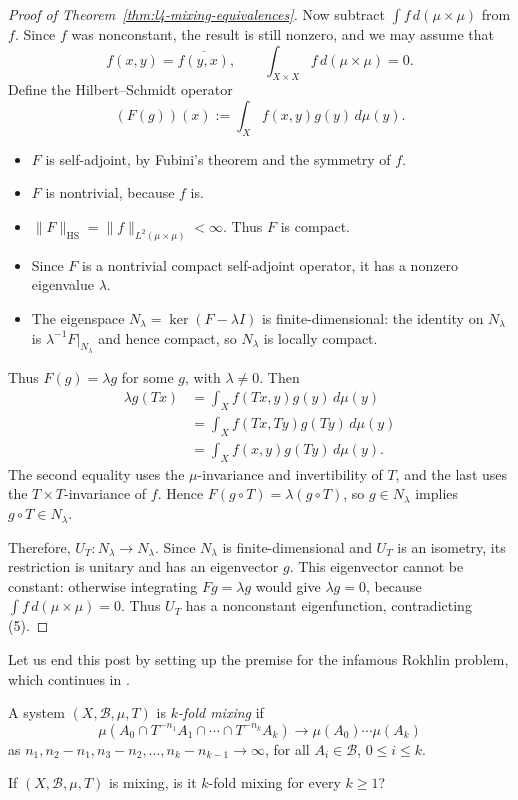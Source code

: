 \documentclass[11pt,a4paper]{article}
\begin{document}
\begin{proof}[Proof of Theorem~\ref{thm:l4-mixing-equivalences}]
Now subtract $\int f\,d(\mu\times\mu)$ from $f$. Since $f$ was nonconstant,
the result is still nonzero, and we may assume that
\[
 f(x,y)=\overline{f(y,x)},\qquad \int_{X\times X}f\,d(\mu\times\mu)=0.
\]
Define the Hilbert--Schmidt operator
\[
 (F(g))(x):=\int_Xf(x,y)g(y)\,d\mu(y).
\]
\begin{itemize}
 \item $F$ is self-adjoint, by Fubini's theorem and the symmetry of $f$.
 \item $F$ is nontrivial, because $f$ is.
 \item $\|F\|_{\mathrm{HS}}=\|f\|_{L^2(\mu\times\mu)}<\infty$. Thus $F$ is
 compact.
 \item Since $F$ is a nontrivial compact self-adjoint operator, it has a
 nonzero eigenvalue $\lambda$.
 \item The eigenspace $N_\lambda=\ker(F-\lambda I)$ is finite-dimensional:
 the identity on $N_\lambda$ is $\lambda^{-1}F|_{N_\lambda}$ and hence
 compact, so $N_\lambda$ is locally compact.
\end{itemize}
Thus $F(g)=\lambda g$ for some $g$, with $\lambda\ne0$. Then
\[
 \begin{aligned}
 \lambda g(Tx)
 &=\int_X f(Tx,y)g(y)\,d\mu(y)\\
 &=\int_X f(Tx,Ty)g(Ty)\,d\mu(y)\\
 &=\int_X f(x,y)g(Ty)\,d\mu(y).
 \end{aligned}
\]
The second equality uses the $\mu$-invariance and invertibility of $T$, and
the last uses the $T\times T$-invariance of $f$. Hence
$F(g\circ T)=\lambda(g\circ T)$, so $g\in N_\lambda$ implies
$g\circ T\in N_\lambda$.

Therefore, $U_T:N_\lambda\to N_\lambda$. Since $N_\lambda$ is
finite-dimensional and $U_T$ is an isometry, its restriction is unitary and
has an eigenvector $g$. This eigenvector cannot be constant: otherwise
integrating $Fg=\lambda g$ would give $\lambda g=0$, because
$\int f\,d(\mu\times\mu)=0$. Thus $U_T$ has a nonconstant eigenfunction,
contradicting (5).




\end{proof}

Let us end this post by setting up the premise for the infamous Rokhlin
problem, which continues in .
\setcounter{definition}{7}\begin{definition}
A system $(X,\mathcal B,\mu,T)$ is \emph{$k$-fold mixing} if
\[
 \mu(A_0\cap T^{-n_1}A_1\cap\cdots\cap T^{-n_k}A_k)
 \longrightarrow\mu(A_0)\cdots\mu(A_k)
\]
as $n_1,n_2-n_1,n_3-n_2,\ldots,n_k-n_{k-1}\to\infty$, for all
$A_i\in\mathcal B$, $0\leq i\leq k$.
\end{definition}
\begin{question}
If $(X,\mathcal B,\mu,T)$ is mixing, is it $k$-fold mixing for every
$k\geq1$?
\end{question}
\end{document}
